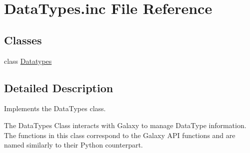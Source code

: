 \hypertarget{DataTypes_8inc}{}\section{Data\+Types.\+inc File Reference}
\label{DataTypes_8inc}
\subsection*{Classes}
\begin{DoxyCompactItemize}
\item 
class \hyperlink{classDatatypes}{Datatypes}
\end{DoxyCompactItemize}


\subsection{Detailed Description}
Implements the Data\+Types class.

The Data\+Types Class interacts with Galaxy to manage Data\+Type information. The functions in this class correspond to the Galaxy A\+PI functions and are named similarly to their Python counterpart. 